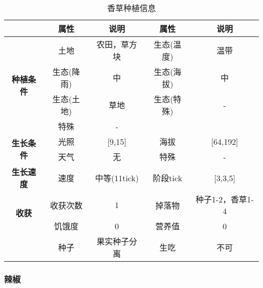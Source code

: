\begin{table}[H]
    \centering
    \caption{香草种植信息}
    \label{table:香草种植信息}
    \setlength{\tabcolsep}{4mm}
    \begin{tabular}{c|cc|cc}
        \toprule
                                           & \textbf{属性} & \textbf{说明} & \textbf{属性} & \textbf{说明}    \\
        \midrule
        \multirow{4}{*}{\textbf{种植条件}} & 土地          & 农田，草方块  & 生态(温度)    & 温带             \\
                                           & 生态(降雨)    & 中            & 生态(海拔)    & 中               \\
                                           & 生态(土地)    & 草地          & 生态(特殊)    & -                \\
                                           & 特殊          & -                                                \\
        \midrule
        \multirow{2}{*}{\textbf{生长条件}} & 光照          & [9,15]        & 海拔          & [64,192]         \\
                                           & 天气          & 无            & 特殊          & -                \\
        \midrule
        \textbf{生长速度}                  & 速度          & 中等(11tick)  & 阶段tick      & [3,3,5]          \\
        \midrule
        \multirow{2}{*}{\textbf{收获}}     & 收获次数      & 1             & 掉落物        & 种子1-2，香草1-4 \\
                                           & 饥饿度        & 0             & 营养值        & 0                \\
                                           & 种子          & 果实种子分离  & 生吃          & 不可             \\
        \bottomrule
    \end{tabular}
\end{table}

\subsubsection{辣椒}

